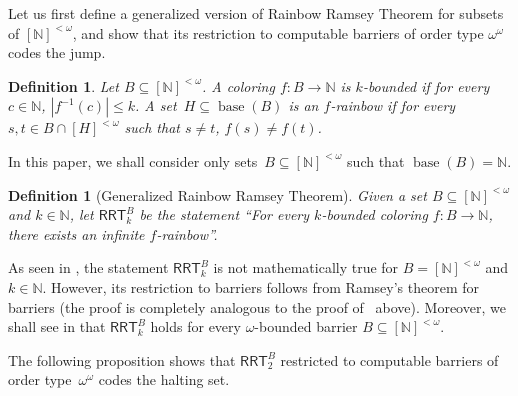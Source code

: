 \documentclass[10pt,a4paper]{article}
\newcommand{\RRT}[0]{\mathsf{RRT}}
\newcommand{\NN}[0]{\mathbb{N}}
\newcommand{\base}{\operatorname{base}}
\def\qt#1{``#1''}%
\numberwithin{theorem}{section}
\newtheorem{proposition}[theorem]{Proposition}
\newtheorem{definition}[theorem]{Definition}
\begin{document}
Let us first define a generalized version of Rainbow Ramsey Theorem for subsets of $[\NN]^{<\omega}$, and show that its restriction to computable barriers of order type $\omega^\omega$ codes the jump.

\begin{definition}
Let $B \subseteq [\NN]^{<\omega}$.
A coloring $f : B \to \NN$ is \emph{$k$-bounded} if for every~$c \in \NN$, $|f^{-1}(c)| \leq k$.
A set~$H \subseteq \base(B)$ is an \emph{$f$-rainbow} if for every~$s, t \in B \cap [H]^{<\omega}$ such that $s \neq t$, $f(s) \neq f(t)$.
\end{definition}

In this paper, we shall consider only sets~$B\subseteq [\NN]^{<\omega}$ such that $\base(B) = \NN$.


\begin{definition}[Generalized Rainbow Ramsey Theorem]
Given a set $B \subseteq [\NN]^{<\omega}$ and $k \in \NN$, let $\RRT^B_k$ be the statement \qt{For every $k$-bounded coloring $f : B \to \NN$, there exists an infinite $f$-rainbow}.    
\end{definition}

As seen in , the statement $\RRT^B_k$ is not mathematically true for $B = [\NN]^{<\omega}$ and $k\in \NN$. However, its restriction to barriers follows from Ramsey's theorem for barriers (the proof is completely analogous to the proof of~ above). Moreover, we shall see in  that $\RRT^B_k$ holds for every $\omega$-bounded barrier $B \subseteq [\NN]^{<\omega}$.

The following proposition shows that $\RRT^B_2$ restricted to computable barriers of order type~$\omega^\omega$ codes the halting set.


\end{document}
